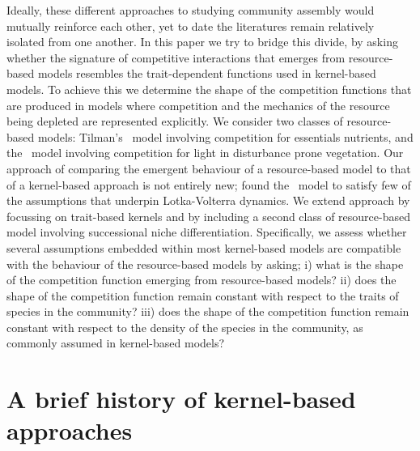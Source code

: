 \documentclass[a4paper,11pt]{article}
\begin{document}
Ideally, these different approaches to studying community assembly
would mutually reinforce each other, yet to date the literatures
remain relatively isolated from one another.
%
In this paper we try to bridge this divide, by asking whether the
signature of competitive interactions that emerges from resource-based
models resembles the trait-dependent functions used in kernel-based
models.
%
To achieve this we determine the shape of the competition functions
that are produced in models where competition and the
mechanics of the resource being depleted are represented explicitly.
We consider two classes of resource-based models: Tilman's
\Rstar\ model involving competition for essentials nutrients,
and the \plant\ model involving competition for light in disturbance prone
vegetation.
Our approach of comparing the emergent behaviour of a resource-based model
to that of a kernel-based approach is not entirely new; \citet{Abrams-2008} found the \Rstar\
model
to satisfy few of the assumptions that underpin Lotka-Volterra
dynamics.
%
We extend \citeauthor{Abrams-2008} approach by focussing on trait-based kernels and
by
including a second class of resource-based model involving
successional niche differentiation.
%
Specifically, we assess whether several assumptions embedded within
most kernel-based models are compatible with the behaviour of the
resource-based models by asking;
%
i) what is the shape of the competition function emerging from resource-based
models?
%
ii) does the shape of the competition function remain constant with
respect to the traits of species in the community?
%
iii) does the shape of the competition function remain constant with
respect to the density of the species in the community, as commonly
assumed in kernel-based models?

\section{A brief history of kernel-based approaches}
\end{document}
